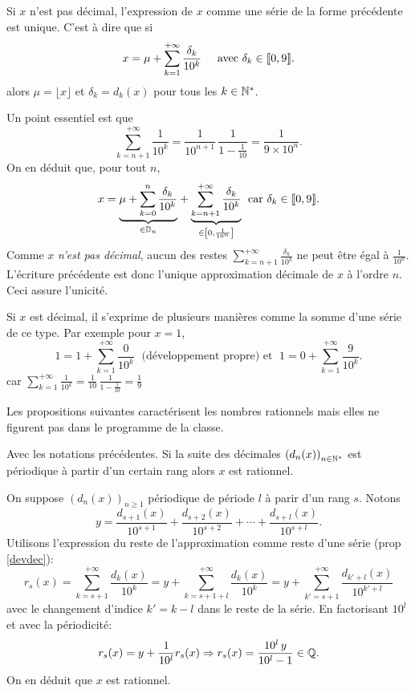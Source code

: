 \begin{propn}
 Si $x$ n'est pas décimal, l'expression de $x$ comme une série de la forme précédente est unique. C'est à dire que si
\[
 x = \mu + \sum_{k=1}^{+\infty} \frac{\delta_k}{10^k} \hspace{0.5cm} \text{avec } \delta_k \in \llbracket 0,9 \rrbracket.
\]
alors $\mu = \lfloor x \rfloor$ et $\delta_k = d_k(x)$ pour tous les $k \in \mathbb{N}^*$.
\end{propn}
\begin{demo}
Un point essentiel est que 
\[
\sum_{k=n+1}^{+\infty}\frac{1}{10^k} = \frac{1}{10^{n+1}}\,\frac{1}{1-\frac{1}{10}} = \frac{1}{9\times 10^n}.
\]
On en déduit que, pour tout $n$,
\[
 x = \underset{ \in \mathbb{D}_n}{\underbrace{\mu + \sum_{k=0}^{n}\frac{\delta_k}{10^k}}} 
 + \underset{ \in \left[ 0,\frac{1}{10^{n}}\right] }{\underbrace{\sum_{k=n+1}^{+\infty}\frac{\delta_k}{10^k}}}\; \text{ car } \delta_k \in \llbracket 0,9\rrbracket.
\]
Comme $x$ \emph{n'est pas décimal}, aucun des restes $\sum_{k=n+1}^{+\infty}\frac{\delta_k}{10^k}$ ne peut être égal à $\frac{1}{10^n}$. L'écriture précédente est donc l'unique approximation décimale de $x$ à l'ordre $n$. Ceci assure l'unicité.
\end{demo}
\begin{rem}
 Si $x$ est décimal, il s'exprime de plusieurs manières comme la somme d'une série de ce type. Par exemple pour $x=1$,
\[
 1 = 1 + \sum_{k=1}^{+\infty} \frac{0}{10^{k}} \;\text{ (développement propre) et } \; 1 = 0 + \sum_{k=1}^{+\infty} \frac{9}{10^{k}}.
\]
car $\sum_{k=1}^{+\infty} \frac{1}{10^{k}} = \frac{1}{10}\,\frac{1}{1 - \frac{1}{10}} = \frac{1}{9}$
\end{rem}
Les propositions suivantes caractérisent les nombres rationnels mais elles ne figurent pas dans le programme de la classe.
\begin{propn}
 Avec les notations précédentes. Si la suite des décimales $\left( d_n(x) \right)_{n \in \mathbb{N}^*}$ est périodique à partir d'un certain rang alors $x$ est rationnel. 
\end{propn}
\begin{demo}
 On suppose $\left( d_n(x) \right)_{n \geq 1}$ périodique de période $l$ à parir d'un rang $s$. Notons
\[
 y = \frac{d_{s+1}(x)}{10^{s+1}} + \frac{d_{s+2}(x)}{10^{s+2}} + \cdots + \frac{d_{s+l}(x)}{10^{s+l}}.  
\]
Utilisons l'expression du reste de l'approximation comme reste d'une série (prop \ref{devdec}):
\[
 r_{s}(x) = \sum_{k=s+1}^{+\infty}\frac{d_k(x)}{10^k}
 = y + \sum_{k=s+1+l}^{+\infty}\frac{d_k(x)}{10^k}
 = y + \sum_{k'= s+1}^{+\infty}\frac{d_{k'+l}(x)}{10^{k'+l}}
\]
avec le changement d'indice $k' = k - l$ dans le reste de la série. En factorisant $10^{l}$ et avec la périodicité:
\[
 r_s(x) = y + \frac{1}{10^l}r_s(x) \Rightarrow r_s(x) = \frac{10^l\,y}{10^l - 1} \in \mathbb{Q}.
\]
On en déduit que $x$ est rationnel. 
\end{demo}
